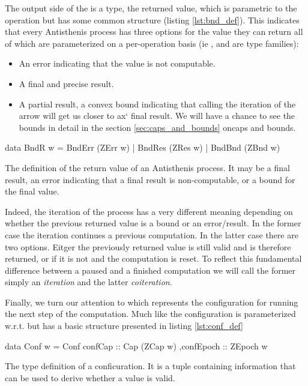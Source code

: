 The output side of the  is a  type, the
returned value, which is parametric to the operation but has some
common structure (listing \ref{lst:bnd_def}). This indicates that every
Antisthenis process has three options for the value they can return
all of which are parameterized on a per-operation basis (ie
,  and  are type families):


\begin{itemize}
\item An error indicating that the value is not computable.
\item A final and precise result.
\item A partial result, a convex bound indicating that calling the
  iteration of the arrow will get us closer to ax` final result. We will
  have a chance to see the bounds in detail in the section
  \ref{sec:caps_and_bounds} oncaps and bounds.
\end{itemize}


\begin{code}
\begin{haskellcode}
data BndR w
  = BndErr (ZErr w)
  | BndRes (ZRes w)
  | BndBnd (ZBnd w)
\end{haskellcode}
  \caption{\label{lst:bnd_def}The definition of the return value of an
    Antisthenis process. It may be a final result, an error indicating
    that a final result is non-computable, or a bound for the final
    value.}
\end{code}

Indeed, the iteration of the process has a very different meaning
depending on whether the previous returned value is a bound or an
error/result. In the former case the iteration continues a previous
computation. In the latter case there are two options. Eitger the
previously returned value is still valid and is therefore returned, or
if it is not and the computation is reset. To reflect this fundamental
difference between a paused and a finished computation we will call
the former simply an \emph{iteration} and the latter \emph{coiteration}.

Finally, we turn our attention to  which represents the
configuration for running the next step of the computation. Much like
 the configuration is parameterized w.r.t.  but has
a basic structure presented in listing \ref{lst:conf_def}

\begin{code}
\begin{haskellcode}
data Conf w =
  Conf { confCap :: Cap (ZCap w)
        ,confEpoch :: ZEpoch w
       }
\end{haskellcode}
  \caption{\label{lst:conf_def}The type definition of a
    conficuration. It is a tuple containing information that can be
    used to derive whether a value is valid.}
\end{code}


